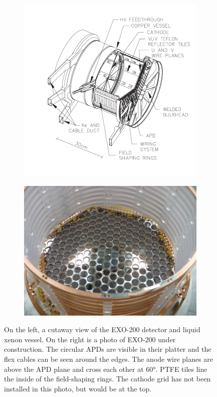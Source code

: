 \documentclass[herrin-thesis.tex]{subfiles}
\begin{document}
\begin{figure}
\centering
\begin{subfigure}[c]{0.42\linewidth}
\includegraphics[width=\textwidth]{./photos/detector_TPC.pdf}
\end{subfigure}\hfill%
\begin{subfigure}[c]{0.54\linewidth}
\includegraphics[width=\textwidth]{./photos/detector_half.jpg}
\end{subfigure}\hfill%
\caption[The EXO-200 detector]{On the left, a cutaway view of the EXO-200 detector and liquid xenon vessel. On the right is a photo of EXO-200 under construction. The circular APDs are visible in their platter and the flex cables can be seen around the edges. The anode wire planes are above the APD plane and cross each other at \ang{60}. PTFE tiles line the inside of the field-shaping rings. The cathode grid has not been installed in this photo, but would be at the top.}
\label{fig:detector_TPC_vessel}
\end{figure}
\end{document}
